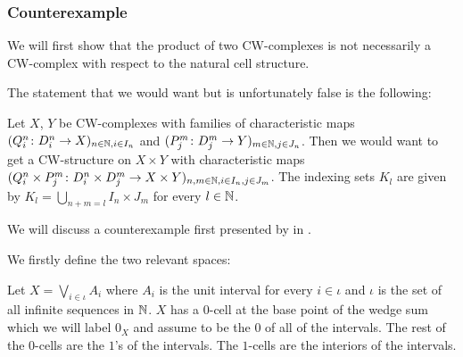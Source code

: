 \subsubsection{Counterexample}

We will first show that the product of two CW-complexes is not necessarily a CW-complex with respect to the natural cell structure.

\begin{rem} \label{rem:wrongproduct}
    The statement that we would want but is unfortunately false is the following: 

    Let $X$, $Y$ be CW-complexes with families of characteristic maps $(Q_i^n \colon D_i^n \to X)_{n \in \mathbb{N}, i \in I_n}$ and $(P_j^m \colon D_j^m \to Y)_{m \in \mathbb{N}, j \in J_n}$. 
    Then we would want to get a CW-structure on $X \times Y$ with characteristic maps $(Q_i^n \times P_j^m \colon D_i^n \times D_j^m \to X \times Y)_{n,m \in \mathbb{N},i \in I_n,j \in J_m}$.
    The indexing sets $K_l$ are given by $K_l = \bigcup_{n + m = l}I_n \times J_m$ for every $l \in \mathbb{N}$.
\end{rem}

We will discuss a counterexample first presented by  in \cite{Dowker1952}. 

We firstly define the two relevant spaces: 

\begin{defi}
    Let $X = \bigvee_{i \in \iota} A_i$ where $A_i$ is the unit interval for every $i \in \iota$ and $\iota$ is the set of all infinite sequences in $\mathbb{N}$. 
    $X$ has a $0$-cell at the base point of the wedge sum which we will label $0_X$ and assume to be the $0$ of all of the intervals. The rest of the $0$-cells are the $1$'s of the intervals. 
    The $1$-cells are the interiors of the intervals. 
\end{defi}

